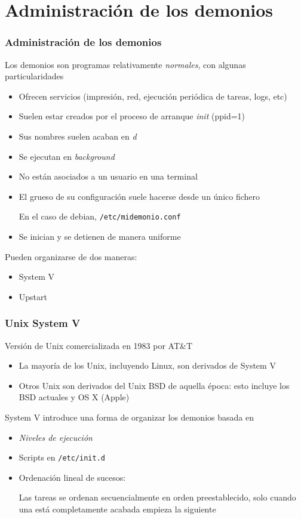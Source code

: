 \documentclass[ucs]{beamer}
\begin{document}
\section{Administración de los demonios}
\begin{frame}[fragile]
\frametitle{Administración de los demonios}

Los demonios son programas relativamente \emph{normales}, con algunas particularidades
\begin{itemize}	
\item
Ofrecen servicios (impresión, red, ejecución periódica de tareas, logs, etc)
\item 
Suelen estar creados por el proceso de arranque \emph{init}  (ppid=1)
\item 
Sus nombres suelen acaban en \emph{d}
\item 
Se ejecutan en \emph{background}
\item 
No están asociados a un usuario en una terminal
\item
El grueso de su configuración suele hacerse desde un 
único fichero 

En el caso de debian,
\verb|/etc/midemonio.conf|
\item 
Se inician y se detienen de manera uniforme
\end{itemize}

Pueden organizarse de dos maneras: 

\begin{itemize}
\item
System V
\item
Upstart
\end{itemize}

\end{frame}


\begin{frame}[fragile]
\frametitle{Unix System V}
Versión de Unix comercializada en 1983 por AT\&T 


\begin{itemize}
\item
La mayoría de los Unix, incluyendo Linux, son derivados de System V
\item
Otros Unix son derivados del Unix BSD de aquella época: esto incluye los BSD actuales
y OS X (Apple) 
\end{itemize}


System V introduce
una forma de organizar los demonios basada en 
\begin{itemize}
\item
\emph{Niveles de ejecución}
\item
Scripts en \verb|/etc/init.d|
\item
Ordenación lineal de sucesos: 

Las tareas se ordenan secuencialmente en orden preestablecido, solo cuando una está completamente
acabada empieza la siguiente
\end{itemize}

\end{frame}
\end{document}
